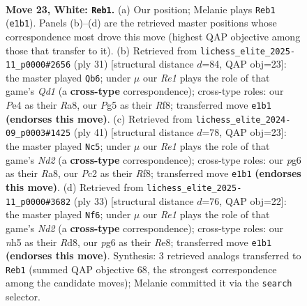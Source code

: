 \documentclass[11pt]{article}
\begin{document}
\begin{figure}[p]\centering
\begin{subfigure}{0.46\textwidth}\centering
\resizebox{\linewidth}{!}{%
\newchessgame
\chessboard[
  setfen={r6r/2qb1kbp/ppnpp1p1/4p1Pn/4P3/2N2P2/PPPK1BQP/R3RB2 w - - 2 23},
  showmover=false,
  pgfstyle=straightmove, color=movearrow, markmove={e1-b1}
]}
\caption{}
\end{subfigure}\hfill
\begin{subfigure}{0.46\textwidth}\centering
\resizebox{\linewidth}{!}{%
\newchessgame
\chessboard[
  setfen={r2q1rk1/1p3ppp/2pn1b2/p2p1b2/P2P4/2P2N1P/1P3PP1/R1BQRBK1 b - - 2 16},
  showmover=false,
  pgfstyle=straightmove, color=movearrow, markmove={d8-b6}
]}
\caption{}
\end{subfigure}
\\[4pt]
\begin{subfigure}{0.46\textwidth}\centering
\resizebox{\linewidth}{!}{%
\newchessgame
\chessboard[
  setfen={r4rk1/1pqnbpp1/p1b1p2p/P3p3/2N1P3/2PBB3/1P2QPPP/R2R2K1 b - - 0 21},
  showmover=false,
  pgfstyle=straightmove, color=movearrow, markmove={d7-c5}
]}
\caption{}
\end{subfigure}\hfill
\begin{subfigure}{0.46\textwidth}\centering
\resizebox{\linewidth}{!}{%
\newchessgame
\chessboard[
  setfen={3rr1k1/1bpnqpbp/pp4p1/8/P1NPp3/4P2P/1PQ1BPPB/R4RK1 b - - 0 17},
  showmover=false,
  pgfstyle=straightmove, color=movearrow, markmove={d7-f6}
]}
\caption{}
\end{subfigure}
\caption{\textbf{Move 23, White: \texttt{Reb1}.} (a) Our position; Melanie plays \texttt{Reb1} (\texttt{e1b1}). Panels (b)--(d) are the retrieved master positions whose correspondence most drove this move (highest QAP objective among those that transfer to it). (b) Retrieved from \texttt{lichess\_elite\_2025-11\_p0000\#2656} (ply 31) [structural distance $d$=84, QAP obj=23]: the master played \texttt{Qb6}; under $\mu$ our \emph{Re1} plays the role of that game's \emph{Qd1} (a \textbf{cross-type} correspondence); cross-type roles: our \emph{P}e4 as their \emph{R}a8, our \emph{P}g5 as their \emph{R}f8; transferred move \texttt{e1b1} \textbf{(endorses this move)}. (c) Retrieved from \texttt{lichess\_elite\_2024-09\_p0003\#1425} (ply 41) [structural distance $d$=78, QAP obj=23]: the master played \texttt{Nc5}; under $\mu$ our \emph{Re1} plays the role of that game's \emph{Nd2} (a \textbf{cross-type} correspondence); cross-type roles: our \emph{p}g6 as their \emph{R}a8, our \emph{P}c2 as their \emph{R}f8; transferred move \texttt{e1b1} \textbf{(endorses this move)}. (d) Retrieved from \texttt{lichess\_elite\_2025-11\_p0000\#3682} (ply 33) [structural distance $d$=76, QAP obj=22]: the master played \texttt{Nf6}; under $\mu$ our \emph{Re1} plays the role of that game's \emph{Nd2} (a \textbf{cross-type} correspondence); cross-type roles: our \emph{n}h5 as their \emph{R}d8, our \emph{p}g6 as their \emph{R}e8; transferred move \texttt{e1b1} \textbf{(endorses this move)}. Synthesis: 3 retrieved analogs transferred to \texttt{Reb1} (summed QAP objective 68, the strongest correspondence among the candidate moves); Melanie committed it via the \texttt{search} selector.}
\label{fig:thought-m44}
\end{figure}
\end{document}

